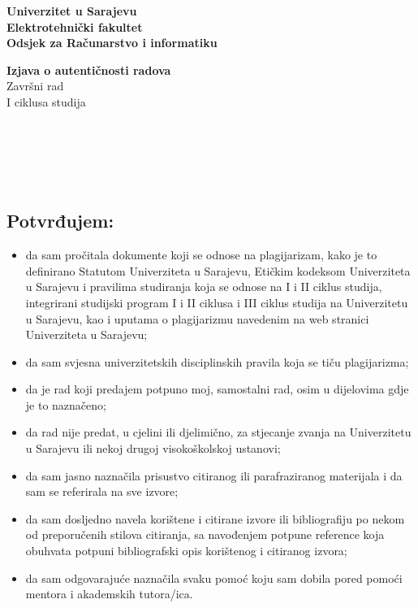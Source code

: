 \pagebreak
\thispagestyle{plain}

\begin{flushleft}
    \textbf{Univerzitet u Sarajevu}\\
    \textbf{Elektrotehnički fakultet}\\
    \textbf{Odsjek za Računarstvo i informatiku}\\
\end{flushleft}

\begin{center}
    \vspace{1cm}
    {\Large \textbf{Izjava o autentičnosti radova}}\\[0.3cm]
    {\Large Završni rad}\\[0.2cm]
    {\Large I ciklusa studija}
    \vspace{0.6cm}
\end{center}

\\
\\
\\
\\

\subsection*{Potvrđujem:}

\begin{itemize}
    \item da sam pročitala dokumente koji se odnose na plagijarizam, kako je to definirano Statutom Univerziteta u Sarajevu, Etičkim kodeksom Univerziteta u Sarajevu i pravilima studiranja koja se odnose na I i II ciklus studija, integrirani studijski program I i II ciklusa i III ciklus studija na Univerzitetu u Sarajevu, kao i uputama o plagijarizmu navedenim na web stranici Univerziteta u Sarajevu;
    \item da sam svjesna univerzitetskih disciplinskih pravila koja se tiču plagijarizma;
    \item da je rad koji predajem potpuno moj, samostalni rad, osim u dijelovima gdje je to naznačeno;
    \item da rad nije predat, u cjelini ili djelimično, za stjecanje zvanja na Univerzitetu u Sarajevu ili nekoj drugoj visokoškolskoj ustanovi;
    \item da sam jasno naznačila prisustvo citiranog ili parafraziranog materijala i da sam se referirala na sve izvore;
    \item da sam dosljedno navela korištene i citirane izvore ili bibliografiju po nekom od preporučenih stilova citiranja, sa navođenjem potpune reference koja obuhvata potpuni bibliografski opis korištenog i citiranog izvora;
    \item da sam odgovarajuće naznačila svaku pomoć koju sam dobila pored pomoći mentora i akademskih tutora/ica.
\end{itemize}

